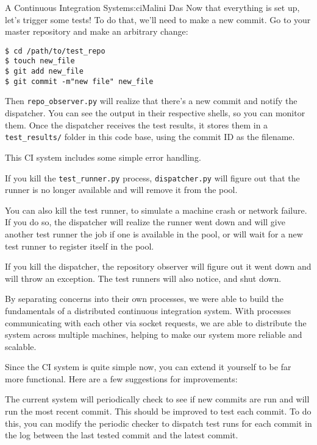 \begin{aosachapter}{A Continuous Integration System}{s:ci}{Malini Das}
Now that everything is set up, let's trigger some tests! To do that,
we'll need to make a new commit. Go to your master repository and make
an arbitrary change:

\begin{verbatim}
$ cd /path/to/test_repo
$ touch new_file
$ git add new_file
$ git commit -m"new file" new_file
\end{verbatim}

Then \texttt{repo\_observer.py} will realize that there's a new commit
and notify the dispatcher. You can see the output in their respective
shells, so you can monitor them. Once the dispatcher receives the test
results, it stores them in a \texttt{test\_results/} folder in this code
base, using the commit ID as the filename.

\label{error-handling}

This CI system includes some simple error handling.

If you kill the \texttt{test\_runner.py} process, \texttt{dispatcher.py}
will figure out that the runner is no longer available and will remove
it from the pool.

You can also kill the test runner, to simulate a machine crash or
network failure. If you do so, the dispatcher will realize the runner
went down and will give another test runner the job if one is available
in the pool, or will wait for a new test runner to register itself in
the pool.

If you kill the dispatcher, the repository observer will figure out it
went down and will throw an exception. The test runners will also
notice, and shut down.

\label{conclusion}

By separating concerns into their own processes, we were able to build
the fundamentals of a distributed continuous integration system. With
processes communicating with each other via socket requests, we are able
to distribute the system across multiple machines, helping to make our
system more reliable and scalable.

Since the CI system is quite simple now, you can extend it yourself to
be far more functional. Here are a few suggestions for improvements:

\label{per-commit-test-runs}

The current system will periodically check to see if new commits are run
and will run the most recent commit. This should be improved to test
each commit. To do this, you can modify the periodic checker to dispatch
test runs for each commit in the log between the last tested commit and
the latest commit.


\end{aosachapter}
